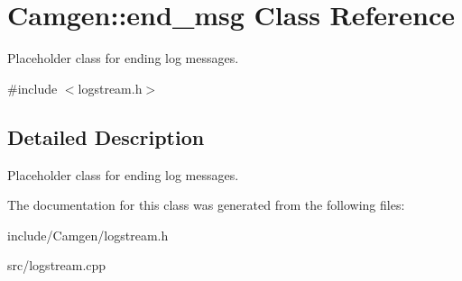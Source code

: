 \hypertarget{a00136}{}\section{Camgen\+:\+:end\+\_\+msg Class Reference}
\label{a00136}


Placeholder class for ending log messages.  




{\ttfamily \#include $<$logstream.\+h$>$}



\subsection{Detailed Description}
Placeholder class for ending log messages. 

The documentation for this class was generated from the following files\+:\begin{DoxyCompactItemize}
\item 
include/\+Camgen/logstream.\+h\item 
src/logstream.\+cpp\end{DoxyCompactItemize}
